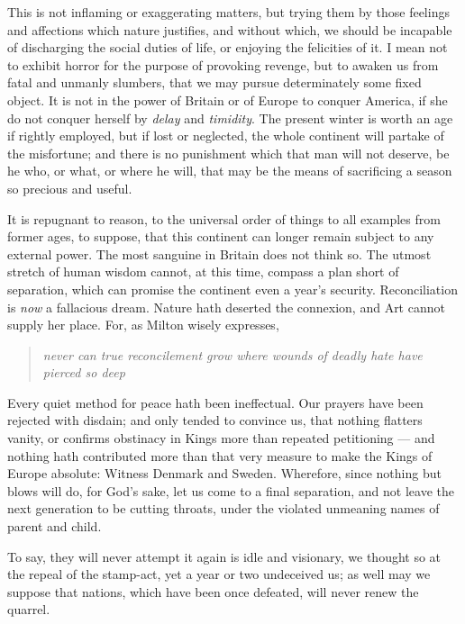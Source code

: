 \documentclass[12pt, twocolumn]{book}
\begin{document}
    This is not inflaming or exaggerating matters, but trying them by those feelings and affections which nature justifies, and without which, we should be incapable of discharging the social duties of life, or enjoying the felicities of it. I mean not to exhibit horror for the purpose of provoking revenge, but to awaken us from fatal and unmanly slumbers, that we may pursue determinately some fixed object. It is not in the power of Britain or of Europe to conquer America, if she do not conquer herself by \textit{delay} and \textit{timidity}. The present winter is worth an age if rightly employed, but if lost or neglected, the whole continent will partake of the misfortune; and there is no punishment which that man will not deserve, be he who, or what, or where he will, that may be the means of sacrificing a season so precious and useful.

    It is repugnant to reason, to the universal order of things to all examples from former ages, to suppose, that this continent can longer remain subject to any external power. The most sanguine in Britain does not think so. The utmost stretch of human wisdom cannot, at this time, compass a plan short of separation, which can promise the continent even a year’s security. Reconciliation is \textit{now} a fallacious dream. Nature hath deserted the connexion, and Art cannot supply her place. For, as Milton wisely expresses, 
    
    {\small \begin{quote}
        \textit{never can true reconcilement grow where wounds of deadly hate have pierced so deep}
    \end{quote}}

    Every quiet method for peace hath been ineffectual. Our prayers have been rejected with disdain; and only tended to convince us, that nothing flatters vanity, or confirms obstinacy in Kings more than repeated petitioning — and nothing hath contributed more than that very measure to make the Kings of Europe absolute: Witness Denmark and Sweden. Wherefore, since nothing but blows will do, for God’s sake, let us come to a final separation, and not leave the next generation to be cutting throats, under the violated unmeaning names of parent and child.

    To say, they will never attempt it again is idle and visionary, we thought so at the repeal of the stamp-act, yet a year or two undeceived us; as well may we suppose that nations, which have been once defeated, will never renew the quarrel.
\end{document}
